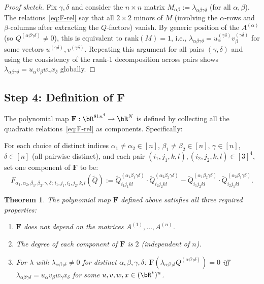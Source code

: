 \documentclass[12pt]{article}
\newtheorem{theorem}{Theorem}
\begin{document}
\begin{proof}[Proof sketch]
Fix $\gamma,\delta$ and consider the $n\times n$ matrix $M_{\alpha\beta} := \lambda_{\alpha\beta\gamma\delta}$ (for all $\alpha,\beta$).  The relations~\eqref{eq:F-rel} say that all $2\times 2$ minors of $M$ (involving the $\alpha$-rows and $\beta$-columns after extracting the $Q$-factors) vanish.  By generic position of the $A^{(\alpha)}$ (so $Q^{(\alpha\beta\gamma\delta)}\neq 0$), this is equivalent to $\mathrm{rank}(M)=1$, i.e., $\lambda_{\alpha\beta\gamma\delta} = u_\alpha^{(\gamma\delta)} v_\beta^{(\gamma\delta)}$ for some vectors $u^{(\gamma\delta)}, v^{(\gamma\delta)}$.  Repeating this argument for all pairs $(\gamma,\delta)$ and using the consistency of the rank-1 decomposition across pairs shows $\lambda_{\alpha\beta\gamma\delta} = u_\alpha v_\beta w_\gamma x_\delta$ globally.
\end{proof}

\subsection*{Step 4: Definition of $\mathbf{F}$}

The polynomial map $\mathbf{F}: \bR^{81n^4}\to\bR^N$ is defined by collecting all the quadratic relations~\eqref{eq:F-rel} as components.  Specifically:

\begin{definition}
  For each choice of distinct indices $\alpha_1\neq\alpha_2\in[n]$, $\beta_1\neq\beta_2\in[n]$, $\gamma\in[n]$, $\delta\in[n]$ (all pairwise distinct), and each pair $(i_1,j_1,k,l),(i_2,j_2,k,l)\in[3]^4$, set one component of $\mathbf{F}$ to be:
  \[
    F_{\alpha_1,\alpha_2,\beta_1,\beta_2,\gamma,\delta;\,i_1,j_1,i_2,j_2,k,l}
    (\tilde{Q}) :=
    \tilde{Q}^{(\alpha_1\beta_1\gamma\delta)}_{i_1j_1kl}
    \cdot\tilde{Q}^{(\alpha_2\beta_2\gamma\delta)}_{i_2j_2kl}
    -
    \tilde{Q}^{(\alpha_1\beta_2\gamma\delta)}_{i_1j_2kl}
    \cdot\tilde{Q}^{(\alpha_2\beta_1\gamma\delta)}_{i_2j_1kl}.
  \]
\end{definition}

\begin{theorem}
  \label{thm:main}
  The polynomial map $\mathbf{F}$ defined above satisfies all three required properties:
  \begin{enumerate}
    \item $\mathbf{F}$ does not depend on the matrices $A^{(1)},\ldots,A^{(n)}$.
    \item The degree of each component of $\mathbf{F}$ is $2$ (independent of $n$).
    \item For $\lambda$ with $\lambda_{\alpha\beta\gamma\delta}\neq 0$ for distinct $\alpha,\beta,\gamma,\delta$: $\mathbf{F}(\lambda_{\alpha\beta\gamma\delta}Q^{(\alpha\beta\gamma\delta)}) = 0$ iff $\lambda_{\alpha\beta\gamma\delta} = u_\alpha v_\beta w_\gamma x_\delta$ for some $u,v,w,x\in(\bR^*)^n$.
  \end{enumerate}
\end{theorem}
\end{document}
